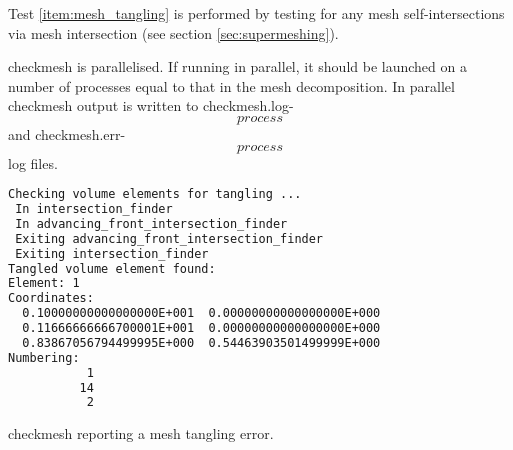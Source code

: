 Test \ref{item:mesh_tangling} is performed by testing for any mesh self-intersections
via mesh intersection (see section \ref{sec:supermeshing}).

checkmesh is parallelised. If running in parallel, it should be launched on a number
of processes equal to that in the mesh decomposition. In parallel checkmesh output
is written to checkmesh.log-\[process\] and checkmesh.err-\[process\] log files.

\begin{example}
\begin{lstlisting}[language = Bash]
Checking volume elements for tangling ...
 In intersection_finder
 In advancing_front_intersection_finder
 Exiting advancing_front_intersection_finder
 Exiting intersection_finder
Tangled volume element found: 
Element: 1
Coordinates:
  0.10000000000000000E+001  0.00000000000000000E+000
  0.11666666666700001E+001  0.00000000000000000E+000
  0.83867056794499995E+000  0.54463903501499999E+000
Numbering:
           1
          14
           2
\end{lstlisting}
\caption{checkmesh reporting a mesh tangling error.}
\end{example}
